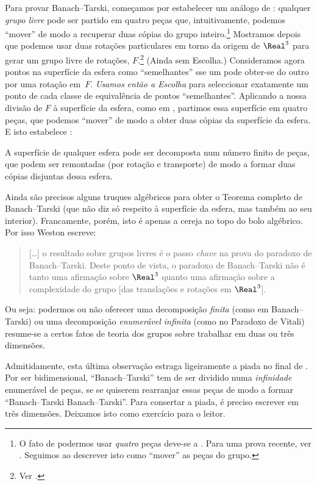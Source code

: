 \documentclass[../../../include/open-logic-section]{subfiles}
\begin{document}
Para provar Banach--Tarski, começamos por estabelecer um análogo de
: qualquer \emph{grupo livre} pode ser partido em quatro
peças que, intuitivamente, podemos ``mover'' de modo a recuperar duas cópias
do grupo inteiro.\footnote{O fato de podermos usar \emph{quatro}
peças deve-se a \cite{Robinson1947}. Para uma prova recente, ver
\citet[Theorem 5.2]{Wagon2016}. Seguimos \citet[p.~3]{Weston2003}
ao descrever isto como ``mover'' as peças do grupo.} Mostramos depois
que podemos usar duas rotações particulares em torno da origem de
$\Real^3$ para gerar um grupo livre de rotações, $F$.\footnote{Ver
\citet[Theorem 2.1]{Wagon2016}.} (Ainda sem Escolha.) Consideramos agora pontos
na superfície da esfera como ``semelhantes'' sse um pode obter-se
do outro por uma rotação em~$F$. \emph{Usamos então a Escolha} para
seleccionar exatamente um ponto de cada classe de equivalência de pontos ``semelhantes''.
Aplicando a nossa divisão de $F$ à superfície da esfera, como
em , partimos essa superfície em quatro peças,
que podemos ``mover'' de modo a obter duas cópias da superfície da
esfera. E isto estabelece \citep{Hausdorff1914}:

\begin{thm} 
A superfície de qualquer esfera pode ser decomposta num número finito de peças,
que podem ser remontadas (por rotação e transporte) de modo a formar duas
cópias disjuntas dessa esfera.
\end{thm}

Ainda são precisos alguns truques algébricos para obter o Teorema completo de
Banach--Tarski (que não diz só respeito à superfície da esfera,
mas também ao seu interior). Francamente, porém, isto é apenas a cereja no topo do
bolo algébrico. Por isso Weston escreve:
\begin{quote}	
  [\ldots] o resultado sobre grupos livres é o passo \emph{chave} na
  prova do paradoxo de Banach--Tarski. Deste ponto de vista, o
  paradoxo de Banach--Tarski não é tanto uma afirmação sobre $\Real^3$ quanto
  uma afirmação sobre a complexidade do grupo [das translações
  e rotações em $\Real^3$]. \cite[p.~16]{Weston2003}
\end{quote}
Ou seja: podermos ou não oferecer uma decomposição \emph{finita} (como em
Banach--Tarski) ou uma decomposição \emph{enumerável infinita} (como no
Paradoxo de Vitali) resume-se a certos fatos de teoria dos grupos sobre
trabalhar em duas ou três dimensões.

Admitidamente, esta última observação estraga ligeiramente a piada no final
de . Por ser bidimensional,
``Banach--Tarski'' tem de ser dividido numa \emph{infinidade} enumerável de
peças, se se quiserem rearranjar essas peças de modo a formar ``Banach--Tarski
Banach--Tarski''. Para consertar a piada, é preciso escrever em três
dimensões. Deixamos isto como exercício para o leitor.
\end{document}
